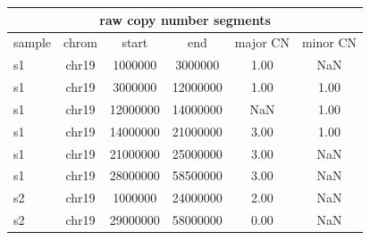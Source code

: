 \documentclass{standalone}
\begin{document}
\begin{tabular}{|l|c|c|c|c|c|}
\hline
\multicolumn{6}{|c|}{\textbf{raw copy number segments}}\\
\hline 

sample & chrom & start & end & major CN & minor CN \\
\hline
s1 & chr19 & 1000000 & 3000000 & 1.00 & NaN \\
s1 & chr19 & 3000000 & 12000000 & 1.00 & 1.00 \\
s1 & chr19 & 12000000 & 14000000 & NaN & 1.00 \\
s1 & chr19 & 14000000 & 21000000 & 3.00 & 1.00 \\
s1 & chr19 & 21000000 & 25000000 & 3.00 & NaN \\
s1 & chr19 & 28000000 & 58500000 & 3.00 & NaN \\
s2 & chr19 & 1000000 & 24000000 & 2.00 & NaN \\
s2 & chr19 & 29000000 & 58000000 & 0.00 & NaN \\
\hline
\end{tabular}
\end{document}

